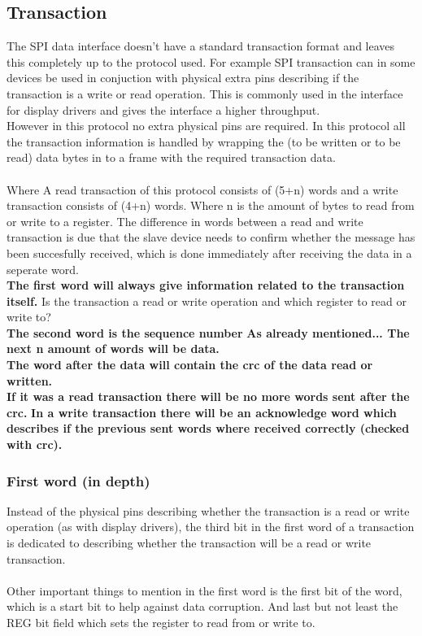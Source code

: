 \subsection{Transaction}
The SPI data interface doesn't have a standard transaction format and leaves this completely up to the protocol used. For example SPI transaction can in some devices be used in conjuction with physical extra pins describing if the transaction is a write or read operation. This is commonly used in the interface for display drivers and gives the interface a higher throughput.
\\
However in this protocol no extra physical pins are required. In this protocol all the transaction information is handled by wrapping the  (to be written or to be read) data bytes in to a frame with the required transaction data.\\\\
Where A read transaction of this protocol consists of (5+n) words and a write transaction consists of (4+n) words. Where n is the amount of bytes to read from or write to a register. The difference in words between a read and write transaction is due that the slave device needs to confirm whether the message has been succesfully received, which is done immediately after receiving the data in a seperate word.
\pagebreak\\
\textbf{The first word will always give information related to the transaction itself.} Is the transaction a read or write operation and which register to read or write to?  \\
\textbf{The second word is the sequence number}
\textbf{As already mentioned... The next n amount of words will be data.}\\
\textbf{The word after the data will contain the crc of the data read or written.}\\
\textbf{If it was a read transaction there will be no more words sent after the crc.}
\textbf{In a write transaction there will be an acknowledge word which describes if the previous sent words where received correctly (checked with crc).}
\subsubsection{First word (in depth)}

Instead of the physical pins describing whether the transaction is a read or write operation (as with display drivers), the third bit in the first word of a transaction is dedicated to describing whether the transaction will be a read or write transaction.
\\\\
Other important things to mention in the first word is the first bit of the word, which is a start bit to help against data corruption. And last but not least the REG bit field which sets the register to read from or write to.

